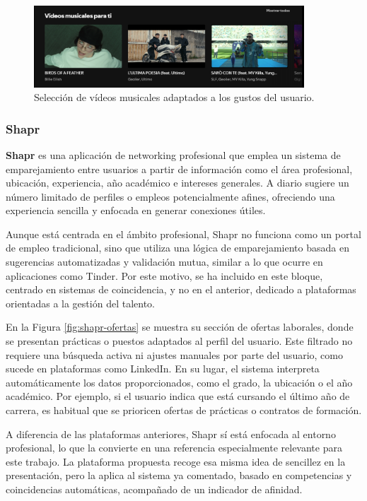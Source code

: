 \begin{figure}[H]
    \centering
    \includegraphics[width=0.9\textwidth]{figs/spotify-videos.png}
    \caption{Selección de vídeos musicales adaptados a los gustos del usuario.}
    \label{fig:spotify-videos}
\end{figure}

\subsubsection{Shapr}

\textbf{Shapr} \cite{shapr} es una aplicación de networking profesional que emplea un
sistema de emparejamiento entre usuarios a partir de información como el área profesional,
ubicación, experiencia, año académico e intereses generales. A diario sugiere un número
limitado de perfiles o empleos potencialmente afines, ofreciendo una experiencia sencilla
y enfocada en generar conexiones útiles.

Aunque está centrada en el ámbito profesional, Shapr no funciona como un portal de empleo
tradicional, sino que utiliza una lógica de emparejamiento basada en sugerencias
automatizadas y validación mutua, similar a lo que ocurre en aplicaciones como Tinder. Por
este motivo, se ha incluido en este bloque, centrado en sistemas de coincidencia, y no en
el anterior, dedicado a plataformas orientadas a la gestión del talento.

En la Figura \ref{fig:shapr-ofertas} se muestra su sección de ofertas laborales, donde se
presentan prácticas o puestos adaptados al perfil del usuario. Este filtrado no requiere
una búsqueda activa ni ajustes manuales por parte del usuario, como sucede en plataformas
como LinkedIn. En su lugar, el sistema interpreta automáticamente los datos proporcionados,
como el grado, la ubicación o el año académico. Por ejemplo, si el usuario indica que está
cursando el último año de carrera, es habitual que se prioricen ofertas de prácticas o
contratos de formación.

A diferencia de las plataformas anteriores, Shapr sí está enfocada al entorno profesional,
lo que la convierte en una referencia especialmente relevante para este trabajo. La
plataforma propuesta recoge esa misma idea de sencillez en la presentación, pero la aplica
al sistema ya comentado, basado en competencias y coincidencias automáticas, acompañado de
un indicador de afinidad.

